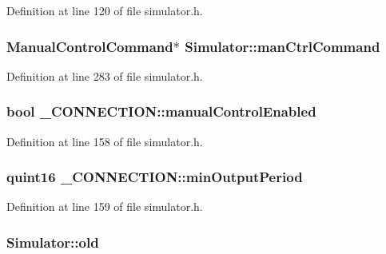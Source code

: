 \-Definition at line 120 of file simulator.\-h.

\hypertarget{group___h_i_t_l_plugin_ga1af06e35c7befb4f3ffd0bfee9a6efc2}{
\subsubsection[{man\-Ctrl\-Command}]{\setlength{\rightskip}{0pt plus 5cm}\-Manual\-Control\-Command$\ast$ {\bf \-Simulator\-::man\-Ctrl\-Command}}}\label{group___h_i_t_l_plugin_ga1af06e35c7befb4f3ffd0bfee9a6efc2}


\-Definition at line 283 of file simulator.\-h.

\hypertarget{group___h_i_t_l_plugin_gac67de1b6ac74a48c592f55fd17e06ad8}{
\subsubsection[{manual\-Control\-Enabled}]{\setlength{\rightskip}{0pt plus 5cm}bool {\bf \-\_\-\-C\-O\-N\-N\-E\-C\-T\-I\-O\-N\-::manual\-Control\-Enabled}}}\label{group___h_i_t_l_plugin_gac67de1b6ac74a48c592f55fd17e06ad8}


\-Definition at line 158 of file simulator.\-h.

\hypertarget{group___h_i_t_l_plugin_ga11d8608f07438f05d1950aa62f774d0c}{
\subsubsection[{min\-Output\-Period}]{\setlength{\rightskip}{0pt plus 5cm}quint16 {\bf \-\_\-\-C\-O\-N\-N\-E\-C\-T\-I\-O\-N\-::min\-Output\-Period}}}\label{group___h_i_t_l_plugin_ga11d8608f07438f05d1950aa62f774d0c}


\-Definition at line 159 of file simulator.\-h.

\hypertarget{group___h_i_t_l_plugin_gadb185afa7e72d63655cb097e1c1d8200}{
\subsubsection[{old}]{ {\bf \-Simulator\-::old}}}\label{group___h_i_t_l_plugin_gadb185afa7e72d63655cb097e1c1d8200}


